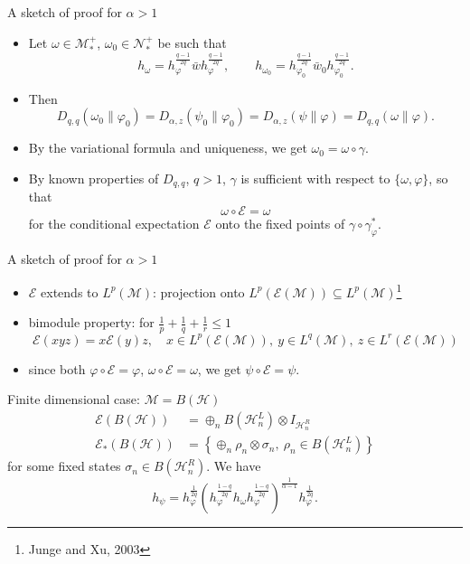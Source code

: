 \documentclass[mathserif]{beamer}
\newcommand{\<}{\langle}
\renewcommand{\>}{\rangle}
\newcommand{\Ee}{\mathcal E}
\newcommand{\Me}{\mathcal M}
\newcommand{\Ne}{\mathcal N}
\begin{document}
\begin{frame}{A sketch of proof for $\alpha>1$}


\begin{itemize}
\item Let $\omega\in \Me_*^+$, $\omega_0\in \Ne_*^+$ be such that
\[
h_\omega=h_\varphi^{\frac{q-1}{2q}}\bar wh_\varphi^{\frac{q-1}{2q}},\qquad
h_{\omega_0}=h_{\varphi_0}^{\frac{q-1}{2q}}\bar w_0h_{\varphi_0}^{\frac{q-1}{2q}}.
\]

\item Then
\[
D_{q,q}(\omega_0\|\varphi_0)=D_{\alpha,z}(\psi_0\|\varphi_0)=D_{\alpha,z}(\psi\|\varphi)=D_{q,q}(\omega\|\varphi).
\]
\item By the variational formula and uniqueness, we get $\omega_0=\omega\circ\gamma$.
\item By known properties of $D_{q,q}$, $q>1$, $\gamma$ is sufficient with respect to
$\{\omega,\varphi\}$, so that 
\[
\omega\circ\Ee=\omega
\]
for the conditional expectation $\Ee$ onto the fixed points of
$\gamma\circ\gamma^*_\varphi$.
\end{itemize}


\end{frame}


\begin{frame}{A sketch of proof for $\alpha>1$}


\begin{itemize}

\item  $\Ee$ extends to $L^p(\Me)$: projection onto $L^p(\Ee(\Me))\subseteq L^p(\Me)$\footnote{Junge and Xu,
2003} 

\item bimodule property: for $\frac1p+\frac1q+\frac1r\le 1$
\[
\Ee(xyz)=x\Ee(y)z,\quad x\in L^p(\Ee(\Me)),\ y\in L^q(\Me),\ z\in L^r(\Ee(\Me))
\]

\item since both $\varphi\circ\Ee=\varphi$, $\omega\circ\Ee=\omega$, we get
$\psi\circ\Ee=\psi$.

\end{itemize}

\bigskip

Finite dimensional case: $\Me=B(\mathcal H)$
\begin{align*}
\Ee(B(\mathcal H))&=\oplus_n B(\mathcal H^L_n)\otimes I_{\mathcal H^R_n}\\
\Ee_*(B(\mathcal H))&=\left\{\oplus_n\rho_n\otimes \sigma_n,\ \rho_n\in B(\mathcal
H^L_n)\right\}
\end{align*}
for some fixed states $\sigma_n\in B(\mathcal H_n^R)$. We have
\[
h_\psi=h_\varphi^{\frac1{2q}}\left(h_\varphi^{\frac{1-q}{2q}}h_\omega
h_\varphi^{\frac{1-q}{2q}}\right)^{\frac1{\alpha-1}}h_\varphi^{\frac1{2q}}.
\]


\end{frame}
\end{document}
